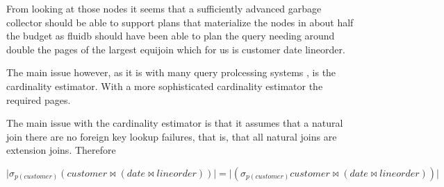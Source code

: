 From looking at those nodes it seems that a sufficiently advanced
garbage collector should be able to support plans that materialize the
nodes in about half the budget as fluidb should have been able to plan
the query needing around double the pages of the largest equijoin
which for us is customer date lineorder.

The main issue however, as it is with many query prolcessing systems
\cite{leisHowGoodAre2015}, is the cardinality estimator. With a more
sophisticated cardinality estimator the required pages.

The main issue with the cardinality estimator is that it assumes that
a natural join there are no foreign key lookup failures, that is, that
all natural joins are extension joins. Therefore

\[
\lvert \sigma _{p(customer)} (customer \Join (date \Join lineorder)) \rvert = \lvert (\sigma _{p(customer)} customer \Join (date \Join lineorder)) \rvert
\]
